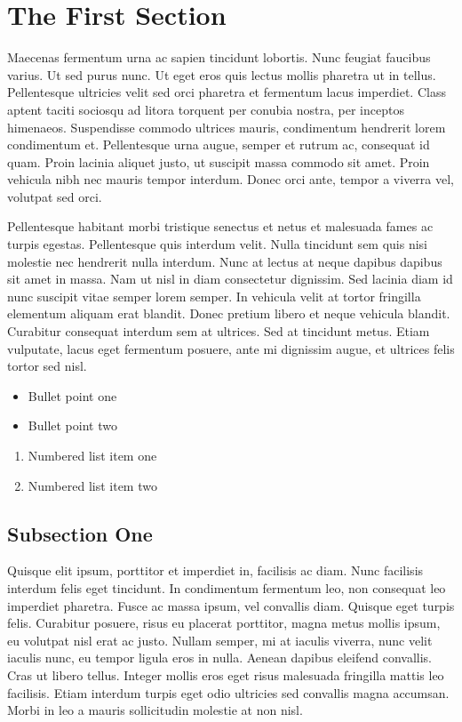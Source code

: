 \documentclass[preprint,12pt,a4paper]{elsarticle}
\begin{document}
\linenumbers

\section{The First Section}
\label{S:1}

Maecenas fermentum urna ac sapien
tincidunt lobortis. Nunc feugiat faucibus varius. Ut sed purus nunc. Ut eget
eros quis lectus mollis pharetra ut in tellus. Pellentesque ultricies velit sed
orci pharetra et fermentum lacus imperdiet. Class aptent taciti sociosqu ad
litora torquent per conubia nostra, per inceptos himenaeos. Suspendisse commodo
ultrices mauris, condimentum hendrerit lorem condimentum et. Pellentesque urna
augue, semper et rutrum ac, consequat id quam. Proin lacinia aliquet justo, ut
suscipit massa commodo sit amet. Proin vehicula nibh nec mauris tempor
interdum. Donec orci ante, tempor a viverra vel, volutpat sed orci.

Pellentesque habitant morbi tristique senectus et netus et malesuada fames ac
turpis egestas. Pellentesque quis interdum velit. Nulla tincidunt sem quis nisi
molestie nec hendrerit nulla interdum. Nunc at lectus at neque dapibus dapibus
sit amet in massa. Nam ut nisl in diam consectetur dignissim. Sed lacinia diam
id nunc suscipit vitae semper lorem semper. In vehicula velit at tortor
fringilla elementum aliquam erat blandit. Donec pretium libero et neque
vehicula blandit. Curabitur consequat interdum sem at ultrices. Sed at
tincidunt metus. Etiam vulputate, lacus eget fermentum posuere, ante mi
dignissim augue, et ultrices felis tortor sed nisl.

\begin{itemize}
\item Bullet point one
\item Bullet point two
\end{itemize}

\begin{enumerate}
\item Numbered list item one
\item Numbered list item two
\end{enumerate}

\subsection{Subsection One}

Quisque elit ipsum, porttitor et imperdiet in, facilisis ac diam. Nunc
facilisis interdum felis eget tincidunt. In condimentum fermentum leo, non
consequat leo imperdiet pharetra. Fusce ac massa ipsum, vel convallis diam.
Quisque eget turpis felis. Curabitur posuere, risus eu placerat porttitor,
magna metus mollis ipsum, eu volutpat nisl erat ac justo. Nullam semper, mi at
iaculis viverra, nunc velit iaculis nunc, eu tempor ligula eros in nulla.
Aenean dapibus eleifend convallis. Cras ut libero tellus. Integer mollis eros
eget risus malesuada fringilla mattis leo facilisis. Etiam interdum turpis eget
odio ultricies sed convallis magna accumsan. Morbi in leo a mauris sollicitudin
molestie at non nisl.
\end{document}
